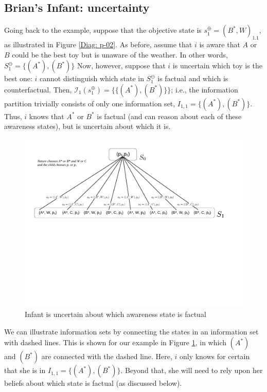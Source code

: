 \documentclass[
11pt,
titlepage,
reqno,
]{article}%
\theoremstyle{definition}
\begin{document}
\subsection{Brian's Infant: uncertainty}
Going back to the example, suppose that the objective state is $s^\oplus_1=(B^\ast,W)_{1.1}$,  as illustrated in Figure \ref{Diag: p-02}.
As before, assume that $i$ is aware that $A$ or $B$ could be the best toy but is unaware of the weather.
In other words, $S^\ominus_1=\{(A^\ast),(B^\ast)\}$
Now, however, suppose that $i$ is uncertain which toy is the best one: $i$ cannot distinguish which state in $S^\ominus_1$ is factual and which is counterfactual. 
Then, $\mathcal{I}_1(s^\oplus_1)=\{\{(A^\ast),(B^\ast)\}\}$; i.e., the information partition trivially consists of only one information set, $I_{1,1}=\{(A^\ast),(B^\ast)\}$.
Thus, $i$ knows that $A^\ast$ or $B^\ast$ is factual (and can reason about each of these awareness states), but is uncertain about which it is.

\begin{figure}[h!]
	\centering
	\includegraphics*[page=3,trim = 0in 6in 5.5in 0in,scale=.8]{Awareness_Diagrams_All}
	
	\caption{Infant is uncertain about which awareness state is factual\label{Diag: p-03}}%
\end{figure}

We can illustrate information sets by connecting the states in an information set with dashed lines.
This is shown for our example in Figure \ref{Diag: p-03}, in which $(A^\ast)$ and  $(B^\ast)$ are connected with the dashed line. 
Here, $i$ only knows for certain that she is in $I_{1,1}=\{(A^\ast),(B^\ast)\}$.
Beyond that, she will need to rely upon her beliefs about which state is factual (as discussed below).  
\end{document}
